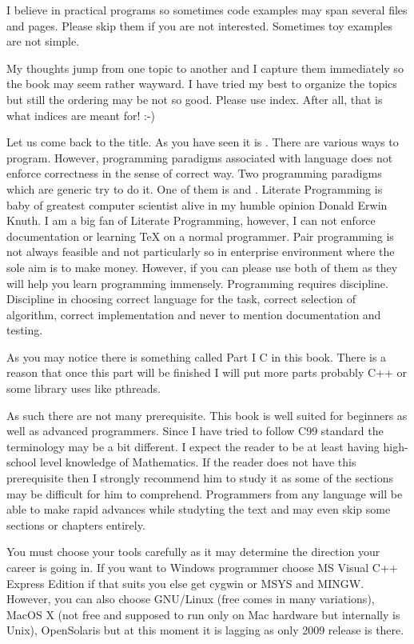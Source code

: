 I believe in practical programs so sometimes code examples may span several
files and pages. Please skip them if you are not interested. Sometimes toy
examples are not simple.

My thoughts jump from one topic to another and I capture them immediately so
the book may seem rather wayward. I have tried my best to organize the topics
but still the ordering may be not so good. Please use index. After all, that 
is what indices are meant for! :-)

Let us come back to the title. As you have seen it is . There are various ways to program. However, programming paradigms
associated with language does not enforce correctness in the sense of correct
way. Two programming paradigms which are generic try to do it. One of them is
 and . Literate
Programming is baby of greatest computer scientist alive in my humble opinion
Donald Erwin Knuth. I am a big fan of Literate Programming, however, I can not
enforce documentation or learning \TeX{} on a normal programmer. Pair
programming is not always feasible and not particularly so in enterprise
environment where the sole aim is to make money. However, if you can
please use both of them as they will help you learn programming
immensely. Programming requires discipline. Discipline in choosing
correct language for the task, correct selection of algorithm, correct
implementation and never to mention documentation and testing.

As you may notice there is something called Part I C in this
book. There is a reason that once this part will be finished I will
put more parts probably C++ or some library uses like pthreads.

\subject{Prerequisite}
As such there are not many prerequisite. This book is well suited for
beginners as well as advanced programmers. Since I have tried to
follow C99 standard the terminology may be a bit different. I expect
the reader to be at least having high-school level knowledge of
Mathematics. If the reader does not have this prerequisite then I
strongly recommend him to study it as some of the sections may be
difficult for him to comprehend. Programmers from any language will be
able to make rapid advances while studyting the text and may even skip
some sections or chapters entirely.

\subject{Tools}
You must choose your tools carefully as it may determine the direction
your career is going in. If you want to Windows programmer choose MS
Visual C++ Express Edition if that suits you else get cygwin or MSYS
and MINGW. However, you can also choose GNU/Linux (free comes in many
variations), MacOS X (not free and supposed to run only on Mac
hardware but internally is Unix), OpenSolaris but at this moment it is
lagging as only 2009 release is there.

